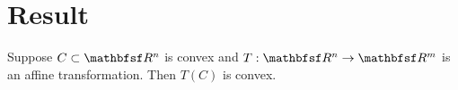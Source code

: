 
\section*{Result}

\begin{proposition}
Suppose $C \subset \R ^n$ is convex and $T: \R ^n \to \R ^m$ is an affine transformation.
Then $T(C)$ is convex.
\end{proposition}

\blankpage
